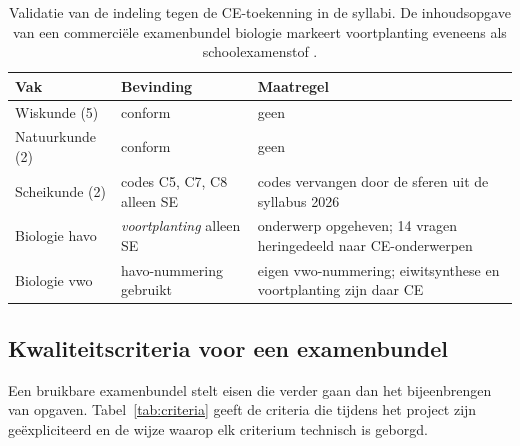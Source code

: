 \documentclass[10.5pt,a4paper]{article}
\begin{document}
\begin{table}[!htb]
\centering\small
\begin{tabularx}{\linewidth}{@{}l l X@{}}
\toprule
\sffamily\bfseries Vak & \sffamily\bfseries Bevinding & \sffamily\bfseries Maatregel \\
\midrule
Wiskunde (5) & conform & geen \\
Natuurkunde (2) & conform & geen \\
Scheikunde (2) & codes C5, C7, C8 alleen SE & codes vervangen door de sferen uit de syllabus 2026 \\
Biologie havo & \emph{voortplanting} alleen SE & onderwerp opgeheven; 14 vragen heringedeeld naar CE-onderwerpen \\
Biologie vwo & havo-nummering gebruikt & eigen vwo-nummering; eiwitsynthese en voortplanting zijn daar CE \\
\bottomrule
\end{tabularx}
\caption{Validatie van de indeling tegen de CE-toekenning in de syllabi. De inhoudsopgave van een commerciële examenbundel
biologie markeert voortplanting eveneens als schoolexamenstof \cite{bundel}.}
\label{tab:validatie}
\end{table}

\subsection{Kwaliteitscriteria voor een examenbundel}
Een bruikbare examenbundel stelt eisen die verder gaan dan het bijeenbrengen van opgaven. Tabel~\ref{tab:criteria} geeft de
criteria die tijdens het project zijn geëxpliciteerd en de wijze waarop elk criterium technisch is geborgd.
\end{document}

